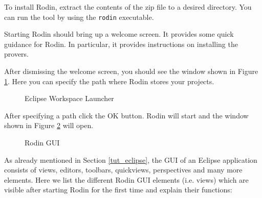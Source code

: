 To install Rodin, extract the contents of the zip file to a desired directory. You can run the tool by using the \texttt{rodin} executable.

Starting Rodin should bring up a welcome screen.  It provides some quick guidance for Rodin.  In particular, it provides instructions on installing the provers.


After dismissing the welcome screen, you should see the window shown in Figure \ref{fig_tut_02_workspace_launcher}. Here you can specify the path where Rodin stores your projects.

\begin{figure}[!ht]
\begin{center}
	\caption{Eclipse Workspace Launcher}
	\label{fig_tut_02_workspace_launcher}
\end{center}
\end{figure}

After specifying a path click the \textsf{OK} button. Rodin will start and the window shown in Figure \ref{fig_tut_02_rodin_gui} will open.


\begin{figure}[!ht]
\begin{center}
	\caption{Rodin GUI}
	\label{fig_tut_02_rodin_gui}
\end{center}
\end{figure}

As already mentioned in Section \ref{tut_eclipse}, the GUI of an Eclipse application consists of views, editors, toolbars, quickviews, perspectives and many more elements. Here we list the different Rodin GUI elements (i.e. views) which are visible after starting Rodin for the first time and explain their functions:

